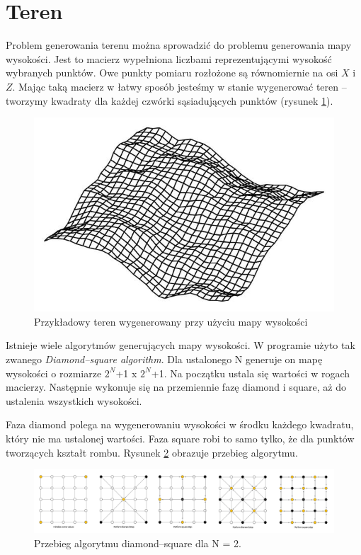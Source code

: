 \documentclass[inz,longabstract]{iithesis}
\begin{document}
    \section{Teren}
        Problem generowania terenu można sprowadzić do problemu generowania mapy wysokości. Jest to macierz wypełniona liczbami reprezentującymi wysokość wybranych punktów. Owe punkty pomiaru rozłożone są równomiernie na osi $X$ i $Z$. Mając taką macierz w łatwy sposób jesteśmy w stanie wygenerować teren -- tworzymy kwadraty dla każdej czwórki sąsiadujących punktów (rysunek \ref{fig:heightmap}). 
        \begin{figure}[H]
            \includegraphics[width=\linewidth]{heightmap.png}
            \caption{Przykładowy teren wygenerowany przy użyciu mapy wysokości \cite{heightmap}} 
            \label{fig:heightmap}
        \end{figure}
        
        Istnieje wiele algorytmów generujących mapy wysokości. W programie użyto tak zwanego \textit{Diamond--square algorithm}. Dla ustalonego N generuje on mapę wysokości o rozmiarze $2^N$+1 x $2^N$+1. Na początku ustala się wartości w rogach macierzy. Następnie wykonuje się na przemiennie fazę diamond i square, aż do ustalenia wszystkich wysokości. 
        
        Faza diamond polega na wygenerowaniu wysokości w środku każdego kwadratu, który nie ma ustalonej wartości. Faza square robi to samo tylko, że dla punktów tworzących kształt rombu. Rysunek \ref{fig:diamondSquare} obrazuje przebieg algorytmu. 
        \begin{figure}[H]
            \includegraphics[width=\linewidth]{diamondSquare.png}
            \caption{Przebieg algorytmu diamond--square dla N = 2.} 
            \label{fig:diamondSquare}
        \end{figure}
        
\end{document}

